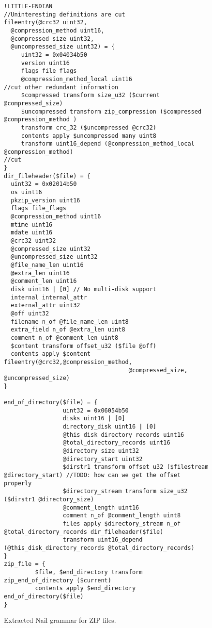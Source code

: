 \begin{figure}
\begin{verbatim}
!LITTLE-ENDIAN
//Uninteresting definitions are cut
fileentry(@crc32 uint32,
  @compression_method uint16,
  @compressed_size uint32, 
  @uncompressed_size uint32) = { 
     uint32 = 0x04034b50
     version uint16
     flags file_flags
     @compression_method_local uint16
//cut other redundant information 
     $compressed transform size_u32 ($current @compressed_size)
     $uncompressed transform zip_compression ($compressed @compression_method )
     transform crc_32 ($uncompressed @crc32)
     contents apply $uncompressed many uint8
     transform uint16_depend (@compression_method_local @compression_method)
//cut
}
dir_fileheader($file) = {
  uint32 = 0x02014b50
  os uint16
  pkzip_version uint16
  flags file_flags
  @compression_method uint16      
  mtime uint16
  mdate uint16
  @crc32 uint32
  @compressed_size uint32
  @uncompressed_size uint32
  @file_name_len uint16
  @extra_len uint16
  @comment_len uint16
  disk uint16 | [0] // No multi-disk support
  internal internal_attr
  external_attr uint32
  @off uint32
  filename n_of @file_name_len uint8
  extra_field n_of @extra_len uint8
  comment n_of @comment_len uint8
  $content transform offset_u32 ($file @off)
  contents apply $content fileentry(@crc32,@compression_method,
                                    @compressed_size, @uncompressed_size)
}

end_of_directory($file) = { 
                 uint32 = 0x06054b50
                 disks uint16 | [0]
                 directory_disk uint16 | [0]
                 @this_disk_directory_records uint16
                 @total_directory_records uint16
                 @directory_size uint32 
                 @directory_start uint32
                 $dirstr1 transform offset_u32 ($filestream @directory_start) //TODO: how can we get the offset properly
                 $directory_stream transform size_u32 ($dirstr1 @directory_size)
                 @comment_length uint16
                 comment n_of @comment_length uint8
                 files apply $directory_stream n_of @total_directory_records dir_fileheader($file)
                 transform uint16_depend (@this_disk_directory_records @total_directory_records)
}
zip_file = { 
         $file, $end_directory transform zip_end_of_directory ($current)
         contents apply $end_directory end_of_directory($file)
}
\end{verbatim}
\caption{Extracted Nail grammar for ZIP files.}
\label{fig:zip-extract}
\end{figure}
